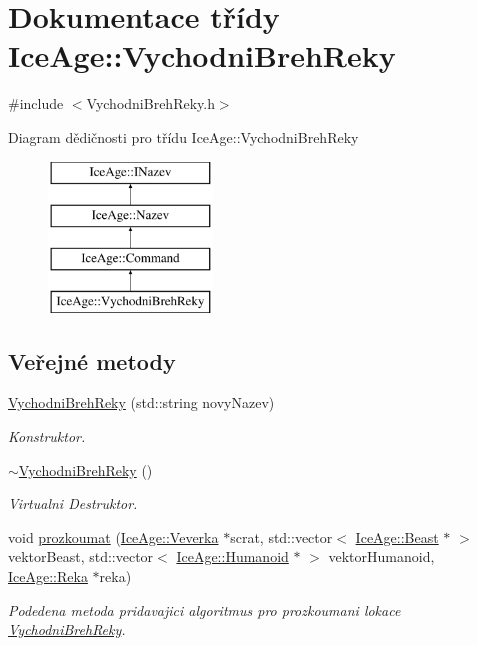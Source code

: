 \hypertarget{classIceAge_1_1VychodniBrehReky}{}\section{Dokumentace třídy Ice\+Age\+:\+:Vychodni\+Breh\+Reky}
\label{classIceAge_1_1VychodniBrehReky}


{\ttfamily \#include $<$Vychodni\+Breh\+Reky.\+h$>$}

Diagram dědičnosti pro třídu Ice\+Age\+:\+:Vychodni\+Breh\+Reky\begin{figure}[H]
\begin{center}
\leavevmode
\includegraphics[height=4.000000cm]{db/d84/classIceAge_1_1VychodniBrehReky}
\end{center}
\end{figure}
\subsection*{Veřejné metody}
\begin{DoxyCompactItemize}
\item 
\hyperlink{classIceAge_1_1VychodniBrehReky_a9d5257fc3109d8ee985e16c412bbe40d}{Vychodni\+Breh\+Reky} (std\+::string novy\+Nazev)
\begin{DoxyCompactList}\small\item\em Konstruktor. \end{DoxyCompactList}\item 
\hyperlink{classIceAge_1_1VychodniBrehReky_a3b71658a8879f9961ad778006db54ea9}{$\sim$\+Vychodni\+Breh\+Reky} ()
\begin{DoxyCompactList}\small\item\em Virtualni Destruktor. \end{DoxyCompactList}\item 
void \hyperlink{classIceAge_1_1VychodniBrehReky_a9be648ec1c37e14c3532813685fe1ee1}{prozkoumat} (\hyperlink{classIceAge_1_1Veverka}{Ice\+Age\+::\+Veverka} $\ast$scrat, std\+::vector$<$ \hyperlink{classIceAge_1_1Beast}{Ice\+Age\+::\+Beast} $\ast$ $>$ vektor\+Beast, std\+::vector$<$ \hyperlink{classIceAge_1_1Humanoid}{Ice\+Age\+::\+Humanoid} $\ast$ $>$ vektor\+Humanoid, \hyperlink{classIceAge_1_1Reka}{Ice\+Age\+::\+Reka} $\ast$reka)
\begin{DoxyCompactList}\small\item\em Podedena metoda pridavajici algoritmus pro prozkoumani lokace \hyperlink{classIceAge_1_1VychodniBrehReky}{Vychodni\+Breh\+Reky}. \end{DoxyCompactList}\end{DoxyCompactItemize}
